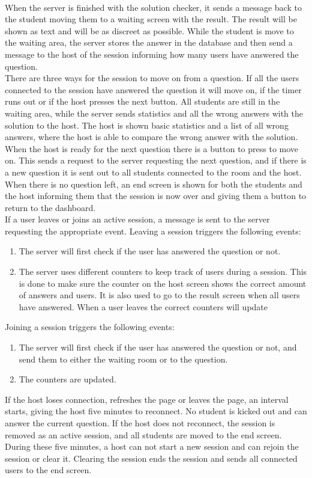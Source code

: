 \\[11pt]
When the server is finished with the solution checker, it sends a message back to the student moving them to a waiting screen with the result. The result will be shown as text and will be as discreet as possible. While the student is move to the waiting area, the server stores the answer in the database and then send a message to the host of the session informing how many users have answered the question.
\\[11pt]
There are three ways for the session to move on from a question. If all the users connected to the session have answered the question it will move on, if the timer runs out or if the host presses the next button. All students are still in the waiting area, while the server sends statistics and all the wrong answers with the solution to the host. The host is shown basic statistics and a list of all wrong answers, where the host is able to compare the wrong answer with the solution. When the host is ready for the next question there is a button to press to move on. This sends a request to the server requesting the next question, and if there is a new question it is sent out to all students connected to the room and the host. When there is no question left, an end screen is shown for both the students and the host informing them that the session is now over and giving them a button to return to the dashboard.
\\[11pt]
If a user leaves or joins an active session, a message is sent to the server requesting the appropriate event. Leaving a session triggers the following events:
\begin{enumerate}
    \item The server will first check if the user has answered the question or not. 
    \item The server uses different counters to keep track of users during a session. This is done to make sure the counter on the host screen shows the correct amount of answers and users. It is also used to go to the result screen when all users have answered. When a user leaves the correct counters will update
\end{enumerate}
Joining a session triggers the following events:
\begin{enumerate}
    \item The server will first check if the user has answered the question or not, and send them to either the waiting room or to the question.
    \item The counters are updated.
\end{enumerate}
If the host loses connection, refreshes the page or leaves the page, an interval starts, giving the host five minutes to reconnect. No student is kicked out and can answer the current question. If the host does not reconnect, the session is removed as an active session, and all students are moved to the end screen. During these five minutes, a host can not start a new session and can rejoin the session or clear it. Clearing the session ends the session and sends all connected users to the end screen.